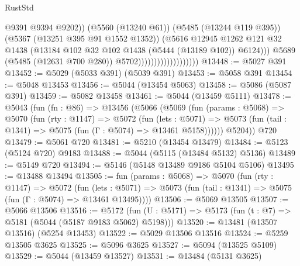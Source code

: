 \begin{lexlean}{RustStd}
\begin{coremodule}
                                                @9391
                                                @9394
                                                @9202))
                                            (@5560 (@13240 @61))
                                            (@5485 (@13244 @119 @395))
                                            (@5367 (@13251 @395 @91 @1552 @1352))
                                            (@5616
                                              @12945
                                              @1262
                                              @121
                                              @32
                                              @1438
                                              (@13184
                                                @102
                                                @32
                                                @102
                                                @1438
                                                (@5444 (@13189 @102))
                                                @6124)))
                                          @5689
                                          (@5485 (@12631 @700 @280))
                                          @5702)))))))))))))))))))
@13448 := @5027 @391
@13452 := @5029 (@5033 @391) (@5039 @391)
@13453 := @5058 @391
@13454 := @5048 @13453
@13456 := @5044 (@13454 @5063)
@13458 := @5086 (@5087 @391)
@13459 := @5082 @13458
@13461 := @5044 (@13459 @5111)
@13478 := @5043
    (fun (fn : @86) =>
    @13456
      (@5066
        (@5069
          (fun (params : @5068) =>
          @5070
            (fun (rty : @1147) =>
            @5072
              (fun (lets : @5071) =>
              @5073 (fun (tail : @1341) => @5075 (fun (Γ : @5074) => @13461 @5158))))))
        @5204))
    @720
@13479 := @5061 @720
@13481 := @5210 (@13454 @13479)
@13484 := @5123 (@5124 @720) @9183
@13488 := @5044 (@5115 (@13484 @5132) @5136)
@13489 := @5149 @720
@13494 := @5146 (@5148 @13489 @9186 @5104 @5106)
@13495 := @13488 @13494
@13505 := fun (params : @5068) =>
  @5070
    (fun (rty : @1147) =>
    @5072
      (fun (lets : @5071) =>
      @5073 (fun (tail : @1341) => @5075 (fun (Γ : @5074) => @13461 @13495))))
@13506 := @5069 @13505
@13507 := @5066 @13506
@13516 := @5172 (fun (U : @5171) => @5173 (fun (t : @7) => @5181 (@5044 (@5187 @9183 @5062) @5198)))
@13520 := @13481 (@13507 @13516) (@5254 @13453)
@13522 := @5029 @13506 @13516
@13524 := @5259 @13505 @3625
@13525 := @5096 @3625
@13527 := @5094 (@13525 @5109)
@13529 := @5044 (@13459 @13527)
@13531 := @13484 (@5131 @3625)

\end{coremodule}
\end{lexlean}
